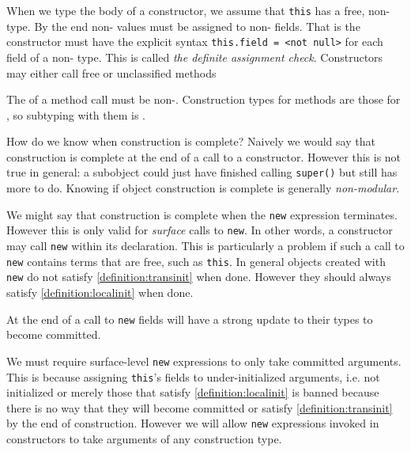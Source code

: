 \documentclass{article}
\begin{document}
\begin{definition}
  When we type the body of a constructor, we assume that \texttt{this} has a free, non-\cringe type.
  By the end non-\cringe{} values must be assigned to non-\cringe{} fields.
  That is the constructor must have the explicit syntax \texttt{this.field = <not null>} for each field of a non-\cringe{} type.
  This is called \textit{the definite assignment check}.
  Constructors may either call free or unclassified methods
\end{definition}

\begin{definition}
  The \receiver{} of a method call must be non-\cringe{}.
  Construction types for methods are those for \receiver{}, so subtyping with them is \contra{}.
\end{definition}

How do we know when construction is complete?
Naively we would say that construction is complete at the end of a call to a constructor.
However this is not true in general: a subobject could just have finished calling \texttt{super()} but still has more to do.
Knowing if object construction is complete is generally \textit{non-modular}.

We might say that construction is complete when the \texttt{new} expression terminates.
However this is only valid for \textit{surface} calls to \texttt{new}.
In other words, a constructor may call \texttt{new} within its declaration.
This is particularly a problem if such a call to \texttt{new} contains terms that are free, such as \texttt{this}.
In general objects created with \texttt{new} do not satisfy \ref{definition:transinit} when done.
However they should always satisfy \ref{definition:localinit} when done.

\begin{remark}\label{remark:constrstrongupdate}
  At the end of a call to \texttt{new} fields will have a strong update to their types to become committed.
\end{remark}

We must require surface-level \texttt{new} expressions to only take committed arguments.
This is because assigning \texttt{this}'s fields to under-initialized arguments, i.e. not initialized or merely those that satisfy \ref{definition:localinit} is banned because there is no way that they will become committed or satisfy \ref{definition:transinit} by the end of construction.
However we will allow \texttt{new} expressions invoked in constructors to take arguments of any construction type.
\end{document}
